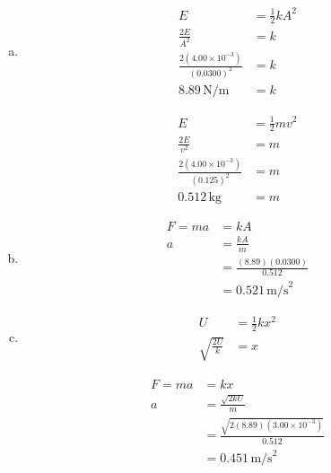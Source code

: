 \documentclass{article}
\begin{document}
\begin{enumerate}[a)]
  \item
        \begin{align*}
          E                                         & = \frac{1}{2}kA^2 \\
          \frac{2E}{A^2}                            & = k               \\
          \frac{2(4.00 \times 10^{-3})}{(0.0300)^2} & = k               \\
          8.89 \,\textrm{N/m}                       & = k
        \end{align*}

        \begin{align*}
          E                                        & = \frac{1}{2}mv^2 \\
          \frac{2E}{v^2}                           & = m               \\
          \frac{2(4.00 \times 10^{-3})}{(0.125)^2} & = m               \\
          0.512 \,\textrm{kg}                      & = m
        \end{align*}

  \item
        \begin{align*}
          F = ma & = kA                           \\
          a      & = \frac{kA}{m}                 \\
                 & = \frac{(8.89)(0.0300)}{0.512} \\
                 & = 0.521 \,\textrm{m/s}^2
        \end{align*}

  \item
        \begin{align*}
          U                   & = \frac{1}{2}kx^2 \\
          \sqrt{\frac{2U}{k}} & = x
        \end{align*}

        \begin{align*}
          F = ma & = kx                                                \\
          a      & = \frac{\sqrt{2kU}}{m}                              \\
                 & = \frac{\sqrt{2(8.89)(3.00 \times 10^{-3})}}{0.512} \\
                 & = 0.451 \,\textrm{m/s}^2
        \end{align*}
\end{enumerate}
\end{document}
